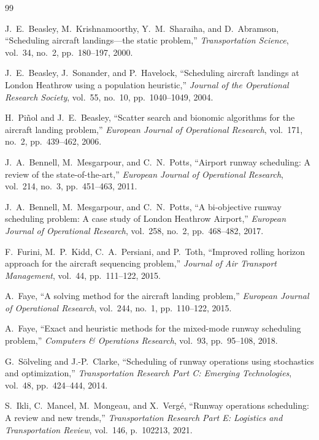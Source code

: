 \documentclass[10pt,journal,compsoc]{IEEEtran}
\begin{document}

\begin{thebibliography}{99}

J.~E.~Beasley, M.~Krishnamoorthy, Y.~M.~Sharaiha, and D.~Abramson, ``Scheduling aircraft landings---the static problem,'' \emph{Transportation Science}, vol.~34, no.~2, pp.~180--197, 2000.

J.~E.~Beasley, J.~Sonander, and P.~Havelock, ``Scheduling aircraft landings at London Heathrow using a population heuristic,'' \emph{Journal of the Operational Research Society}, vol.~55, no.~10, pp.~1040--1049, 2004.

H.~Pi{\~n}ol and J.~E.~Beasley, ``Scatter search and bionomic algorithms for the aircraft landing problem,'' \emph{European Journal of Operational Research}, vol.~171, no.~2, pp.~439--462, 2006.

J.~A.~Bennell, M.~Mesgarpour, and C.~N.~Potts, ``Airport runway scheduling: A review of the state-of-the-art,'' \emph{European Journal of Operational Research}, vol.~214, no.~3, pp.~451--463, 2011.

J.~A.~Bennell, M.~Mesgarpour, and C.~N.~Potts, ``A bi-objective runway scheduling problem: A case study of London Heathrow Airport,'' \emph{European Journal of Operational Research}, vol.~258, no.~2, pp.~468--482, 2017.

F.~Furini, M.~P.~Kidd, C.~A.~Persiani, and P.~Toth, ``Improved rolling horizon approach for the aircraft sequencing problem,'' \emph{Journal of Air Transport Management}, vol.~44, pp.~111--122, 2015.

A.~Faye, ``A solving method for the aircraft landing problem,'' \emph{European Journal of Operational Research}, vol.~244, no.~1, pp.~110--122, 2015.

A.~Faye, ``Exact and heuristic methods for the mixed-mode runway scheduling problem,'' \emph{Computers \& Operations Research}, vol.~93, pp.~95--108, 2018.

G.~S{\"o}lveling and J.-P.~Clarke, ``Scheduling of runway operations using stochastics and optimization,'' \emph{Transportation Research Part C: Emerging Technologies}, vol.~48, pp.~424--444, 2014.

S.~Ikli, C.~Mancel, M.~Mongeau, and X.~Verg{\'e}, ``Runway operations scheduling: A review and new trends,'' \emph{Transportation Research Part E: Logistics and Transportation Review}, vol.~146, p.~102213, 2021.


\end{thebibliography}
\end{document}
